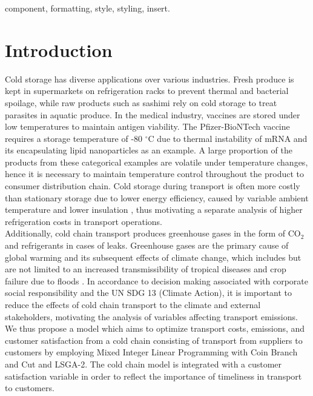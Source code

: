 \documentclass[conference]{IEEEtran}
\begin{document}
\begin{IEEEkeywords}
component, formatting, style, styling, insert.
\end{IEEEkeywords}

\section{Introduction}

Cold storage has diverse applications over various industries. Fresh produce is kept in supermarkets on refrigeration racks to prevent thermal and bacterial spoilage, while raw products such as sashimi rely on cold storage to treat parasites in aquatic produce. In the medical industry, vaccines are stored under low temperatures to maintain antigen viability. The Pfizer-BioNTech vaccine
requires a storage temperature of -80 $^{\circ}$C due to thermal instability of mRNA and its encapsulating lipid nanoparticles as an example\cite{uddin_challenges_2021}. A large proportion of the products from these categorical examples are volatile under temperature changes, hence it is necessary to maintain temperature control throughout the product to consumer distribution chain. Cold storage during transport is often more costly than stationary storage due to lower energy efficiency, caused by variable ambient temperature and lower insulation \cite{maiorino_refrigerated_2021}, thus motivating a separate analysis of higher refrigeration costs in transport operations.\\
Additionally, cold chain transport produces greenhouse gases in the form of CO$_2$ and refrigerants in cases of leaks. Greenhouse gases are the primary cause of global warming and its subsequent effects of climate change, which includes but are not limited to an increased transmissibility of tropical diseases \cite{thomson_climate_2022} and crop failure due to floods \cite{mirza_climate_2011}. In accordance to decision making associated with 
corporate social responsibility and the UN SDG 13 (Climate Action), it is important to reduce the effects of cold chain transport to the climate and external stakeholders, motivating the analysis of variables affecting  transport emissions.\\
We thus propose a model which aims to optimize transport costs, emissions, and customer satisfaction from a cold chain consisting of transport from suppliers to customers by employing Mixed Integer Linear Programming with Coin Branch and Cut and LSGA-2. The cold chain model is integrated with a customer satisfaction variable in order to reflect the importance of timeliness  in transport to customers.
\end{document}
